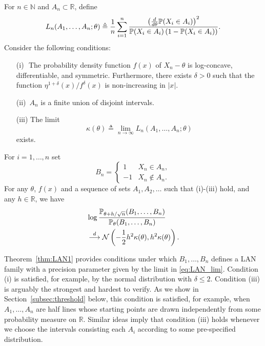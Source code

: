 \begin{thm} \label{thm:LAN1}
For $n \in \mathbb N$ and $A_n \subset \mathbb R$,  define
\begin{equation}
\label{eq:precision_general}
L_n(A_1,\ldots,A_n;\theta) \triangleq \frac{1}{n} \sum_{i=1}^n \frac{ \left(\frac{d}{d \theta} \mathbb{P}(X_i \in A_i) \right)^2 }{ \mathbb{P}(X_i \in A_i)\left(1- \mathbb{P}(X_i \in A_i) \right) }. 
\end{equation}
Consider the following conditions:
\begin{itemize}
\item [(i)\,\,] The probability density function $f(x)$ of $X_n-\theta$ is log-concave, differentiable, and symmetric. Furthermore, there exists $\delta>0$ such that the function $\eta^{1+\delta}(x)/f^\delta(x)$ is non-increasing in $|x|$. 
\item[(ii)\,] $A_n$ is a finite union of disjoint intervals.
\item[(iii)] The limit 
\begin{equation}
\label{eq:LAN_lim}
\kappa(\theta) \triangleq \lim_{n\to \infty} L_n(A_1,\ldots,A_n; \theta)
\end{equation}
exists. 
\end{itemize}
For $i=1,\ldots,n$ set
\[
B_n = \begin{cases} 1 & X_n \in A_n, \\
-1 & X_n \notin A_n. 
\end{cases} 
\]
For any $\theta$, $f(x)$ and a sequence of sets $A_1,A_2,\ldots$ such that (i)-(iii) hold, and any $h\in \mathbb R$, we have
\begin{align*}
& \log  \frac{ \mathbb P_{\theta+h/\sqrt{n}} (B_1,\ldots,B_n) }{
\mathbb P_{\theta} (B_1,\ldots,B_n)} \\
& \overset{d}{\longrightarrow} \mathcal{N}\left(-\frac{1}{2} h^2 \kappa(\theta), h^2 \kappa(\theta) \right).
\end{align*} 
\end{thm}
Theorem~\ref{thm:LAN1} provides conditions under which $B_1,\ldots,B_n$ defines a LAN family with a precision parameter given by the limit in \eqref{eq:LAN_lim}. Condition (i) is satisfied, for example, by the normal distribution with $\delta\leq 2$. Condition (iii) is arguably the strongest and hardest to verify. As we show in Section~\ref{subsec:threshold} below, this condition is satisfied, for example, when $A_1, \ldots,A_n$ are half lines whose starting points are drawn independently from some probability measure on $\mathbb R$. Similar ideas imply that condition (iii) holds whenever we choose the intervals consisting each $A_i$ according to some pre-specified distribution. \par
